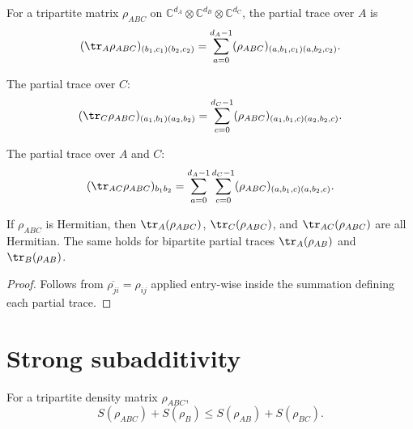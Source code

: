 \begin{definition}\label{def:traceA_ABC}
    \leanok
    For a tripartite matrix $\rho_{ABC}$ on
    $\mathbb{C}^{d_A} \otimes \mathbb{C}^{d_B} \otimes \mathbb{C}^{d_C}$,
    the partial trace over $A$ is
    \[
        (\tr_A \rho_{ABC})_{(b_1, c_1)(b_2, c_2)}
        = \sum_{a=0}^{d_A - 1} (\rho_{ABC})_{(a, b_1, c_1)(a, b_2, c_2)}.
    \]
\end{definition}

\begin{definition}\label{def:traceC_ABC}
    \leanok
    The partial trace over $C$:
    \[
        (\tr_C \rho_{ABC})_{(a_1, b_1)(a_2, b_2)}
        = \sum_{c=0}^{d_C - 1} (\rho_{ABC})_{(a_1, b_1, c)(a_2, b_2, c)}.
    \]
\end{definition}

\begin{definition}\label{def:traceAC_ABC}
    \leanok
    The partial trace over $A$ and $C$:
    \[
        (\tr_{AC} \rho_{ABC})_{b_1 b_2}
        = \sum_{a=0}^{d_A - 1} \sum_{c=0}^{d_C - 1}
        (\rho_{ABC})_{(a, b_1, c)(a, b_2, c)}.
    \]
\end{definition}

\begin{lemma}\label{lem:trace_isHermitian}
    \leanok
    If $\rho_{ABC}$ is Hermitian, then $\tr_A(\rho_{ABC})$,
    $\tr_C(\rho_{ABC})$, and $\tr_{AC}(\rho_{ABC})$ are all Hermitian.
    The same holds for bipartite partial traces $\tr_A(\rho_{AB})$ and
    $\tr_B(\rho_{AB})$.
\end{lemma}

\begin{proof}\leanok
    Follows from $\overline{\rho_{ji}} = \rho_{ij}$ applied entry-wise
    inside the summation defining each partial trace.
\end{proof}

\section{Strong subadditivity}

\begin{theorem}\label{thm:strong_subadditivity}
    \notready
    For a tripartite density matrix $\rho_{ABC}$,
    \[
        S(\rho_{ABC}) + S(\rho_B)
        \le S(\rho_{AB}) + S(\rho_{BC}).
    \]
\end{theorem}

